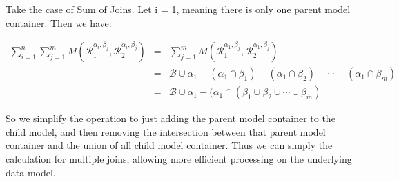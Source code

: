 \documentclass[12pt]{amsart}
\begin{document}
Take the case of Sum of Joins. Let i = 1, meaning there is only one parent model container. Then we have:

\begin{eqnarray}
\sum_{i=1}^n \sum_{j=1}^m M(\mathcal{R}^{\alpha_{i} , \beta_{j}}_{1},\mathcal{R}^{\alpha_{i} , \beta_{j}}_{2} )  & = &
\sum_{j=1}^m M(\mathcal{R}^{\alpha_{1} , \beta_{j}}_{1},\mathcal{R}^{\alpha_{1} , \beta_{j}}_{2} ) \\
& = &
\mathcal{B} \cup \alpha_{1}-(\alpha_{1} \cap \beta_{1}) - (\alpha_{1} \cap \beta_{2})  - \cdots - (\alpha_{1} \cap \beta_{m})  \\ & = &
\mathcal{B} \cup \alpha_{1}-(\alpha_{1} \cap (\beta_{1} \cup \beta_{2}  \cup \cdots  \cup \beta_{m})
\end{eqnarray}

So we simplify the operation to just adding the parent model container to the child model, and then removing the intersection between that parent model container and the union of all child model container. Thus we can simply the calculation for multiple joins, allowing more efficient processing on the underlying data model.

\appendix
\end{document}

